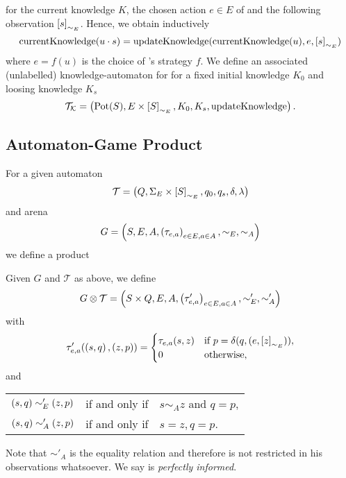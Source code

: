 for the current knowledge $K$, the chosen action $e\in E$ of \eve{} and the 
following observation $\left[s\right]_{\sim_{E}}$. Hence, we obtain inductively
\begin{equation*}
  \operatorname{currentKnowledge}(u\cdot s) = \operatorname{updateKnowledge}(\operatorname{currentKnowledge}(u), e, \left[s\right]_{\sim_{E}})
\end{equation*} 
where $e = f(u)$ is the choice of \eve{}'s strategy $f$. We define an 
associated (unlabelled) knowledge-automaton for \eve{} for a fixed initial 
knowledge $K_{0}$ and loosing knowledge $K_{s}$
\begin{equation*}
  \mathcal{T}_{\mathcal{K}} = \left(
    \operatorname{Pot}(S), E\times\left[S\right]_{\sim_{E}}, K_{0}, K_{s}, \operatorname{updateKnowledge}
  \right).
\end{equation*}

\subsection{Automaton-Game Product}
For a given automaton
\begin{equation*}
  \mathcal{T} = \left(Q, \Sigma_{E}\times \left[S\right]_{\sim_{E}}, q_{0}, 
  q_{s}, \delta, \lambda\right)
\end{equation*}
and arena 
\begin{equation*}
  G = \left(S, E, A, \left(\tau_{e, a}\right)_{e\in E, a\in A}, \sim_{E}, \sim_{A}\right)
\end{equation*}
we define a product
\begin{definition}
  Given $G$ and $\mathcal{T}$ as above, we define
  \begin{equation*}
    G\otimes\mathcal{T} = \left(S\times Q, E, A, 
    \left(\tau'_{e, a}\right)_{e\in E, a\in A}, \sim'_{E}, \sim'_{A}\right)
  \end{equation*}
  with
  \begin{equation*}
    \tau'_{e, a}(\left(s,q\right), \left(z,p\right)) = \begin{cases}
      \tau_{e, a}(s, z)&\text{if }p = \delta(q, (e,\left[z\right]_{\sim_{E}})),\\
      0&\text{otherwise},
    \end{cases}
  \end{equation*}
  and
  \begin{center}
    \begin{tabular}{lll}
      $\left(s, q\right)\sim'_{E}\left(z, p\right)$& if and only if & $s\sim_{A} z$ and 
        $q = p$,\\
      $\left(s, q\right)\sim'_{A}\left(z, p\right)$& if and only if & $s = z, q = p$.
    \end{tabular}
  \end{center}
  Note that $\sim'_{A}$ is the equality relation and therefore \adam{} is not
  restricted in his observations whatsoever. We say \adam{} is 
  \emph{perfectly informed}.
\end{definition}
